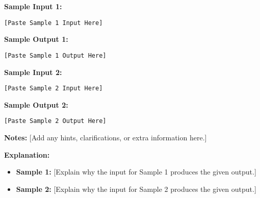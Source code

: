 \documentclass[11pt,a4paper]{article}
\begin{document}
\noindent\textbf{Sample Input 1:}
\begin{verbatim}
[Paste Sample 1 Input Here]
\end{verbatim}

\noindent\textbf{Sample Output 1:}
\begin{verbatim}
[Paste Sample 1 Output Here]
\end{verbatim}

\noindent\textbf{Sample Input 2:}
\begin{verbatim}
[Paste Sample 2 Input Here]
\end{verbatim}

\noindent\textbf{Sample Output 2:}
\begin{verbatim}
[Paste Sample 2 Output Here]
\end{verbatim}

\noindent\textbf{Notes:}
[Add any hints, clarifications, or extra information here.]

\vspace{8pt}
\noindent\textbf{Explanation:}
\begin{itemize}[leftmargin=*, topsep=2pt, partopsep=0pt]
  \item \textbf{Sample 1:} [Explain why the input for Sample 1 produces the given output.]
  \item \textbf{Sample 2:} [Explain why the input for Sample 2 produces the given output.]
\end{itemize}
\end{document}
